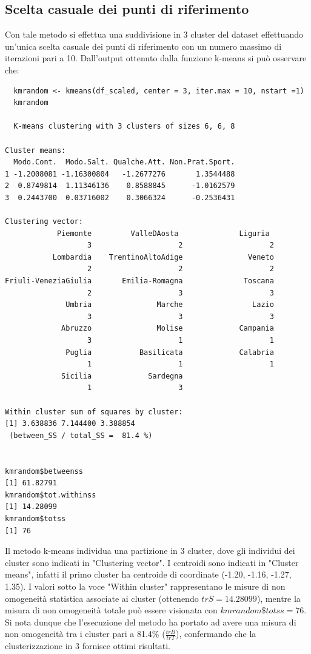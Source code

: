 \subsection{Scelta casuale dei punti di riferimento}\label{cap5.3.1}

Con tale metodo si effettua una suddivisione in 3 cluster del dataset effettuando un'unica scelta casuale dei punti di riferimento con un numero massimo di iterazioni pari a 10. Dall'output ottenuto dalla funzione k-means si può osservare che:

\vspace{5mm}
\begin{lstlisting}
  kmrandom <- kmeans(df_scaled, center = 3, iter.max = 10, nstart =1)
  kmrandom

  K-means clustering with 3 clusters of sizes 6, 6, 8

Cluster means:
  Modo.Cont.  Modo.Salt. Qualche.Att. Non.Prat.Sport.
1 -1.2008081 -1.16300804   -1.2677276       1.3544488
2  0.8749814  1.11346136    0.8588845      -1.0162579
3  0.2443700  0.03716002    0.3066324      -0.2536431

Clustering vector:
            Piemonte         ValleDAosta              Liguria 
                   3                    2                    2 
           Lombardia    TrentinoAltoAdige               Veneto 
                   2                    2                    2 
Friuli-VeneziaGiulia       Emilia-Romagna              Toscana 
                   2                    3                    3 
              Umbria               Marche                Lazio 
                   3                    3                    3 
             Abruzzo               Molise             Campania 
                   3                    1                    1 
              Puglia           Basilicata             Calabria 
                   1                    1                    1 
             Sicilia             Sardegna 
                   1                    3 

Within cluster sum of squares by cluster:
[1] 3.638836 7.144400 3.388854
 (between_SS / total_SS =  81.4 %)

 
kmrandom$betweenss
[1] 61.82791
kmrandom$tot.withinss
[1] 14.28099
kmrandom$totss
[1] 76
\end{lstlisting}
\vspace{5mm}

Il metodo k-means individua una partizione in 3 cluster, dove gli individui dei cluster sono indicati in "Clustering vector". I centroidi sono indicati in "Cluster means", infatti il primo cluster ha centroide di coordinate (-1.20, -1.16, -1.27, 1.35). I valori sotto la voce "Within cluster" rappresentano le misure di non omogeneità statistica associate ai cluster (ottenendo $trS = 14.28099$), mentre la misura di non omogeneità totale può essere visionata con $kmrandom\$totss = 76$. Si nota dunque che l'esecuzione del metodo ha portato ad avere una misura di non omogeneità tra i cluster pari a 81.4\% ($\frac{trB}{trT}$), confermando che la clusterizzazione in 3 fornisce ottimi risultati.

